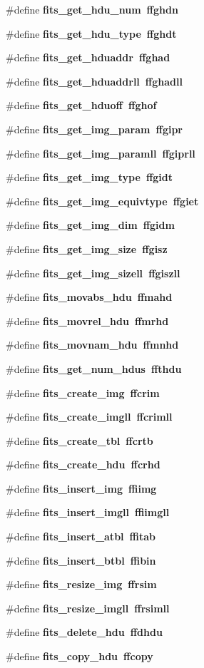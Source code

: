 \begin{CompactItemize}
\#define \bf{fits\_\-get\_\-hdu\_\-num}~ffghdn
\item 
\#define \bf{fits\_\-get\_\-hdu\_\-type}~ffghdt
\item 
\#define \bf{fits\_\-get\_\-hduaddr}~ffghad
\item 
\#define \bf{fits\_\-get\_\-hduaddrll}~ffghadll
\item 
\#define \bf{fits\_\-get\_\-hduoff}~ffghof
\item 
\#define \bf{fits\_\-get\_\-img\_\-param}~ffgipr
\item 
\#define \bf{fits\_\-get\_\-img\_\-paramll}~ffgiprll
\item 
\#define \bf{fits\_\-get\_\-img\_\-type}~ffgidt
\item 
\#define \bf{fits\_\-get\_\-img\_\-equivtype}~ffgiet
\item 
\#define \bf{fits\_\-get\_\-img\_\-dim}~ffgidm
\item 
\#define \bf{fits\_\-get\_\-img\_\-size}~ffgisz
\item 
\#define \bf{fits\_\-get\_\-img\_\-sizell}~ffgiszll
\item 
\#define \bf{fits\_\-movabs\_\-hdu}~ffmahd
\item 
\#define \bf{fits\_\-movrel\_\-hdu}~ffmrhd
\item 
\#define \bf{fits\_\-movnam\_\-hdu}~ffmnhd
\item 
\#define \bf{fits\_\-get\_\-num\_\-hdus}~ffthdu
\item 
\#define \bf{fits\_\-create\_\-img}~ffcrim
\item 
\#define \bf{fits\_\-create\_\-imgll}~ffcrimll
\item 
\#define \bf{fits\_\-create\_\-tbl}~ffcrtb
\item 
\#define \bf{fits\_\-create\_\-hdu}~ffcrhd
\item 
\#define \bf{fits\_\-insert\_\-img}~ffiimg
\item 
\#define \bf{fits\_\-insert\_\-imgll}~ffiimgll
\item 
\#define \bf{fits\_\-insert\_\-atbl}~ffitab
\item 
\#define \bf{fits\_\-insert\_\-btbl}~ffibin
\item 
\#define \bf{fits\_\-resize\_\-img}~ffrsim
\item 
\#define \bf{fits\_\-resize\_\-imgll}~ffrsimll
\item 
\#define \bf{fits\_\-delete\_\-hdu}~ffdhdu
\item 
\#define \bf{fits\_\-copy\_\-hdu}~ffcopy
\item 

\end{CompactItemize}
